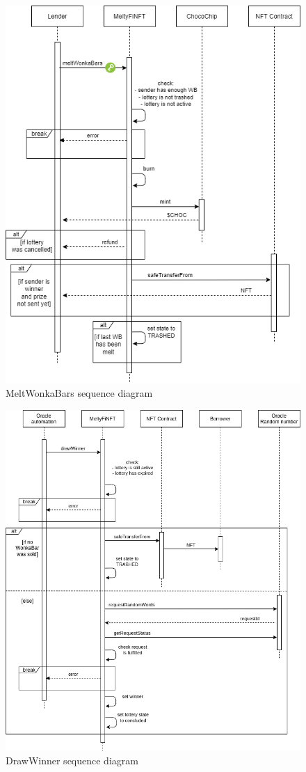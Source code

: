 \begin{figure}[h]
    \centering
    \includegraphics[width=\textwidth]{figures/MeltWonkaBars.png}
    \caption{MeltWonkaBars sequence diagram}
    \label{fig:MeltWonkaBars}
\end{figure}

\begin{figure}[h]
    \centering
    \includegraphics[width=\textwidth]{figures/DrawWinner.png}
    \caption{DrawWinner sequence diagram}
    \label{fig:DrawWinner}
\end{figure}